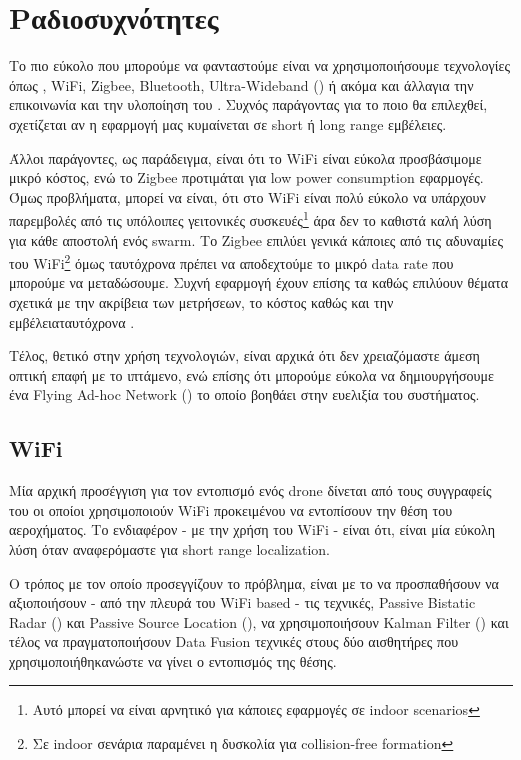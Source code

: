 \section{Ραδιοσυχνότητες}
Το πιο εύκολο που μπορούμε να φανταστούμε είναι να χρησιμοποιήσουμε  τε\-χνο\-λο\-γίες όπως , WiFi, Zigbee, Bluetooth, Ultra-Wideband () ή ακόμα και άλλα\udot για την επικοινωνία και την υλοποίηση του . Συχνός παράγοντας για το ποιο θα επιλεχθεί, σχετίζεται αν η εφαρμογή μας κυμαίνεται σε short ή long range εμβέλειες.

Άλλοι παράγοντες, ως παράδειγμα, είναι ότι το WiFi είναι εύκολα προσβάσιμο\udot με μικρό κόστος, ενώ το Zigbee προτιμάται για low power consumption εφαρμογές. Όμως προβλήματα, μπορεί να είναι, ότι στο WiFi είναι πολύ εύκολο να υπάρχουν παρεμβολές από τις υπόλοιπες γειτονικές 
συσκευές\footnote{Αυτό μπορεί να είναι αρνητικό για κάποιες εφαρμογές σε indoor scenarios} 
άρα δεν το καθιστά καλή λύση για κάθε αποστολή ενός swarm. Το Zigbee επιλύει γενικά κάποιες από τις αδυναμίες του WiFi\footnote{Σε indoor σενάρια παραμένει η δυσκολία για collision-free formation} όμως ταυτόχρονα πρέπει να αποδεχτούμε το μικρό data rate που μπορούμε να μεταδώσουμε. 
Συχνή εφαρμογή έχουν επίσης τα  καθώς επιλύουν θέματα σχετικά με την ακρίβεια των μετρήσεων, 
το κόστος καθώς και την εμβέλεια\udot ταυτόχρονα \cite{uwb-imu-gps3}. 

Τέλος, θετικό στην χρήση  τεχνολογιών, είναι αρχικά ότι δεν χρειαζόμαστε άμεση οπτική επαφή με το ιπτάμενο, ενώ επίσης ότι μπορούμε εύκολα να δημιουργήσουμε
ένα Flying Ad-hoc Network () το οποίο βοηθάει στην ευελιξία του συστήματος.

\subsection{WiFi}
Μία αρχική προσέγγιση για τον εντοπισμό ενός drone δίνεται από τους συγγραφείς του \cite{wifi-passive-active-drone-localization}
οι οποίοι χρησιμοποιούν WiFi προκειμένου να εντοπίσουν την θέση του αεροχήματος. Το ενδιαφέρον - με την χρήση του WiFi - είναι ότι, 
είναι μία εύκολη λύση όταν αναφερόμαστε για short range localization. 

Ο τρόπος με τον οποίο προσεγγίζουν το πρόβλημα, είναι με 
το να προσπαθήσουν να αξιοποιήσουν - από την πλευρά του WiFi based - τις τεχνικές, 
Passive Bistatic Radar () και Passive Source Location (), να χρησιμοποιήσουν Kalman Filter ()
και τέλος να πραγματοποιήσουν Data Fusion τεχνικές στους δύο αισθητήρες που χρησιμοποιήθηκαν\udot ώστε να γίνει ο εντοπισμός της θέσης.

